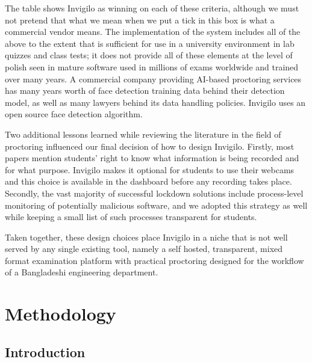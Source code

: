 \documentclass[12pt, a4paper]{report}
\begin{document}
\begin{justify}
  {\fontsize{12}{18}\selectfont
    The table shows Invigilo as winning on each of these criteria, although we must not pretend that what we mean when we put a tick in this box is what a commercial vendor means. The implementation of the system includes all of the above to the extent that is sufficient for use in a university environment in lab quizzes and class tests; it does not provide all of these elements at the level of polish seen in mature software used in millions of exams worldwide and trained over many years. A commercial company providing AI-based proctoring services has many years worth of face detection training data behind their detection model, as well as many lawyers behind its data handling policies. Invigilo uses an open source face detection algorithm.

    Two additional lessons learned while reviewing the literature in the field of proctoring influenced our final decision of how to design Invigilo. Firstly, most papers mention students' right to know what information is being recorded and for what purpose. Invigilo makes it optional for students to use their webcams and this choice is available in the dashboard before any recording takes place. Secondly, the vast majority of successful lockdown solutions include process-level monitoring of potentially malicious software, and we adopted this strategy as well while keeping a small list of such processes transparent for students.

    Taken together, these design choices place Invigilo in a niche that is not well served by any single existing tool, namely a self hosted, transparent, mixed format examination platform with practical proctoring designed for the workflow of a Bangladeshi engineering department.
  }
\end{justify}

\chapter{Methodology}

\section{Introduction}
\end{document}
